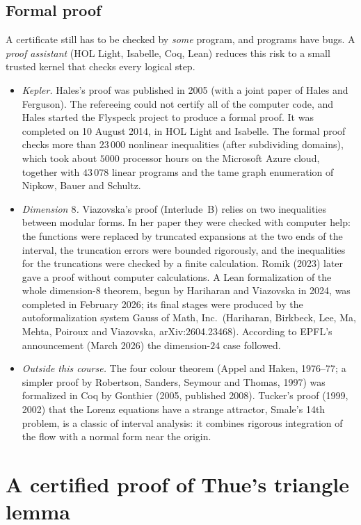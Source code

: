 \subsection{Formal proof}
A certificate still has to be checked by \emph{some} program, and programs have bugs. A \emph{proof
assistant} (HOL Light, Isabelle, Coq, Lean) reduces this risk to a small trusted kernel that checks every
logical step.
\begin{itemize}
\item \emph{Kepler.} Hales's proof was published in 2005 (with a joint paper of Hales and Ferguson). The
  refereeing could not certify all of the computer code, and Hales started the Flyspeck project to produce a
  formal proof. It was completed on 10 August 2014, in HOL Light and
  Isabelle. The formal proof checks more than $23\,000$ nonlinear inequalities (after subdividing domains),
  which took about $5000$ processor hours on the Microsoft Azure cloud, together with $43\,078$ linear
  programs and the tame graph enumeration of Nipkow, Bauer and Schultz.
\item \emph{Dimension $8$.} Viazovska's proof (Interlude~B) relies on two inequalities between
  modular forms. In her paper they were checked with computer help: the functions were replaced by truncated
  expansions at the two ends of the interval, the truncation errors were bounded rigorously, and the
  inequalities for the truncations were checked by a finite calculation. Romik (2023) later gave a proof
  without computer calculations. A Lean formalization of the whole dimension-$8$ theorem, begun by Hariharan
  and Viazovska in 2024, was completed in February 2026; its final stages were produced by the
  autoformalization system Gauss of Math, Inc.\ (Hariharan, Birkbeck, Lee, Ma, Mehta, Poiroux and
  Viazovska, arXiv:2604.23468). According to EPFL's announcement (March 2026) the dimension-$24$ case followed.
\item \emph{Outside this course.} The four colour theorem (Appel and Haken, 1976--77; a simpler proof by
  Robertson, Sanders, Seymour and Thomas, 1997) was formalized in Coq by Gonthier (2005, published 2008).
  Tucker's proof (1999, 2002) that the Lorenz equations have a strange attractor, Smale's 14th problem,
  is a classic of interval analysis: it combines rigorous integration of the flow with a normal form near
  the origin.
\end{itemize}

\section{A certified proof of Thue's triangle lemma}
\label{COMP:sec:thue}

